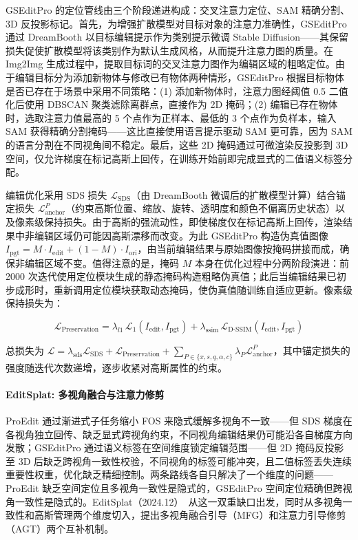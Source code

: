 GSEditPro 的定位管线由三个阶段递进构成：交叉注意力定位、SAM 精确分割、3D 反投影标记。首先，为增强扩散模型对目标对象的注意力准确性，GSEditPro 通过 DreamBooth 以目标编辑提示作为类别提示微调 Stable Diffusion——其保留损失促使扩散模型将该类别作为默认生成风格，从而提升注意力图的质量。在 Img2Img 生成过程中，提取目标词的交叉注意力图作为编辑区域的粗略定位。由于编辑目标分为添加新物体与修改已有物体两种情形，GSEditPro 根据目标物体是否已存在于场景中采用不同策略：(1) 添加新物体时，注意力图经阈值 0.5 二值化后使用 DBSCAN 聚类滤除离群点，直接作为 2D 掩码；(2) 编辑已存在物体时，选取注意力值最高的 5 个点作为正样本、最低的 3 个点作为负样本，输入 SAM 获得精确分割掩码——这比直接使用语言提示驱动 SAM 更可靠，因为 SAM 的语言分割在不同视角间不稳定。最后，这些 2D 掩码通过可微渲染反投影到 3D 空间，仅允许梯度在标记高斯上回传，在训练开始前即完成显式的二值语义标签分配。

编辑优化采用 SDS 损失 $\mathcal{L}_{\text{SDS}}$（由 DreamBooth 微调后的扩散模型计算）结合锚定损失 $\mathcal{L}_{\text{anchor}}^P$（约束高斯位置、缩放、旋转、透明度和颜色不偏离历史状态）以及像素级保持损失。由于高斯的强流动性，即使梯度仅在标记高斯上回传，渲染结果中非编辑区域仍可能因高斯漂移而改变。为此 GSEditPro 构造伪真值图像 $I_{\text{pgt}} = M \cdot I_{\text{edit}} + (1-M) \cdot I_{\text{ori}}$，由当前编辑结果与原始图像按掩码拼接而成，确保非编辑区域不变。值得注意的是，掩码 $M$ 本身在优化过程中分两阶段演进：前 2000 次迭代使用定位模块生成的静态掩码构造粗略伪真值；此后当编辑结果已初步成形时，重新调用定位模块获取动态掩码，使伪真值随训练自适应更新。像素级保持损失为：

\begin{equation}
    \mathcal{L}_{\text{Preservation}} = \lambda_{l1}\,\mathcal{L}_1(I_{\text{edit}}, I_{\text{pgt}}) + \lambda_{\text{ssim}}\,\mathcal{L}_{\text{D-SSIM}}(I_{\text{edit}}, I_{\text{pgt}})
\end{equation}

总损失为 $\mathcal{L} = \lambda_{\text{sds}}\mathcal{L}_{\text{SDS}} + \mathcal{L}_{\text{Preservation}} + \sum_{P \in \{x,s,q,\alpha,c\}} \lambda_P \mathcal{L}_{\text{anchor}}^P$，其中锚定损失的强度随迭代次数递增，逐步收紧对高斯属性的约束。

\paragraph{EditSplat: 多视角融合与注意力修剪}

ProEdit 通过渐进式子任务缩小 FOS 来隐式缓解多视角不一致——但 SDS 梯度在各视角独立回传、缺乏显式跨视角约束，不同视角编辑结果仍可能沿各自梯度方向发散；GSEditPro 通过语义标签在空间维度锁定编辑范围——但 2D 掩码反投影至 3D 后缺乏跨视角一致性校验，不同视角的标签可能冲突，且二值标签丢失连续重要性权重，优化缺乏精细控制。两条路线各自只解决了一个维度的问题——ProEdit 缺乏空间定位且多视角一致性是隐式的，GSEditPro 空间定位精确但跨视角一致性是隐式的。EditSplat（2024.12）~\cite{2412_11520}从这一双重缺口出发，同时从多视角一致性和高斯管理两个维度切入，提出多视角融合引导（MFG）和注意力引导修剪（AGT）两个互补机制。

